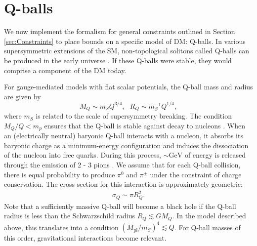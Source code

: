 \documentclass[twocolumn,showpacs,preprintnumbers,amsmath,amssymb,prd]{revtex4}
\begin{document}
\section{Q-balls}
\label{sec:ConcreteExamples}

We now implement the formalism for general constraints outlined in Section \ref{sec:Constraints} to place bounds on a specific model of DM: Q-balls. In various supersymmetric extensions of the SM, non-topological solitons called Q-balls can be produced in the early universe \cite{Coleman:1985ki, Kusenko:1997si}. If these Q-balls were stable, they would comprise a component of the DM today.

For gauge-mediated models with flat scalar potentials, the Q-ball mass and radius are given by
\begin{equation}
\label{eq:Qballprop}
M_Q \sim m_S Q^{3/4}, ~~~ R_Q \sim m_S^{-1} Q^{1/4},
\end{equation}
where $m_S$ is related to the scale of supersymmetry breaking. The condition $M_Q/Q < m_p$ ensures that the Q-ball is stable against decay to nucleons \cite{Dine:2003ax}. When an (electrically neutral) baryonic Q-ball interacts with a nucleon, it absorbs its baryonic charge as a minimum-energy configuration and induces the dissociation of the nucleon into free quarks. During this process, $\sim \text{GeV}$ of energy is released through the emission of 2 - 3 pions \cite{Dine:2003ax}. We assume that for each Q-ball collision, there is equal probability to produce $\pi^0$ and $\pi^\pm$ under the constraint of charge conservation. The cross section for this interaction is approximately geometric:
\begin{align}
\sigma_Q \sim \pi R_Q^2.
\end{align}
Note that a sufficiently massive Q-ball will become a black hole if the Q-ball radius is less than the Schwarzschild radius $R_Q \lesssim G M_Q$. In the model described above, this translates into a condition $(M_\text{pl}/m_S)^4 \lesssim Q$. For Q-ball masses of this order, gravitational interactions become relevant.
\end{document}
